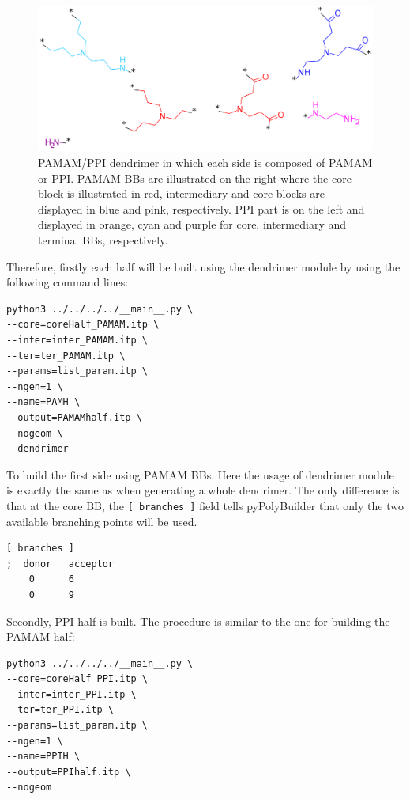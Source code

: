 \begin{figure}
    \centering
    \includegraphics[width=\textwidth]{PAMAM_PPI-half/PAMAMPPIBBs.png}
    \caption{PAMAM/PPI dendrimer in which each side is composed of PAMAM or PPI. PAMAM BBs are illustrated on the right where the core block is illustrated in red, intermediary and core blocks are displayed in blue and pink, respectively. PPI part is on the left and displayed in orange, cyan and purple for core, intermediary and terminal BBs, respectively.}
    \label{fig:HalfBBs}
\end{figure}

Therefore, firstly each half will be built using the dendrimer module by using the following command lines:

\begin{lstlisting}
python3 ../../../../__main__.py \
--core=coreHalf_PAMAM.itp \
--inter=inter_PAMAM.itp \
--ter=ter_PAMAM.itp \
--params=list_param.itp \
--ngen=1 \
--name=PAMH \
--output=PAMAMhalf.itp \
--nogeom \
--dendrimer
\end{lstlisting}

To build the first side using PAMAM BBs.
Here the usage of dendrimer module is exactly the same as when generating a whole dendrimer.
The only difference is that at the core BB, the \texttt{[ branches ]} field tells pyPolyBuilder that only the two available branching points will be used.

\begin{lstlisting}
[ branches ]
;  donor   acceptor
    0      6
    0      9
\end{lstlisting}

Secondly, PPI half is built.
The procedure is similar to the one for building the PAMAM half:

\begin{lstlisting}
python3 ../../../../__main__.py \
--core=coreHalf_PPI.itp \
--inter=inter_PPI.itp \
--ter=ter_PPI.itp \
--params=list_param.itp \
--ngen=1 \
--name=PPIH \
--output=PPIhalf.itp \
--nogeom
\end{lstlisting}

